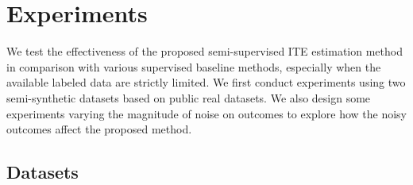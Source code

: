 

\section{Experiments\label{sec:experiments}}
We test the effectiveness of the proposed semi-supervised ITE estimation method in comparison with various supervised baseline methods, especially when the available labeled data are strictly limited. 
We first conduct experiments using two semi-synthetic datasets based on public real datasets. 
We also design some experiments varying the magnitude of noise on outcomes to explore how the noisy outcomes affect the proposed method.







\subsection{Datasets}

